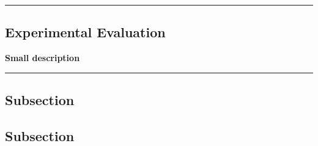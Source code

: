 {\color{gray}\hrule}
\begin{center}
\section{Experimental Evaluation}
\textbf{Small description}
\bigskip
\end{center}
{\color{gray}\hrule}
\begin{multicols}{2}
\subsection{Subsection}
\lipsum[1]
\subsection{Subsection}
\lipsum[1-3]
\end{multicols}
